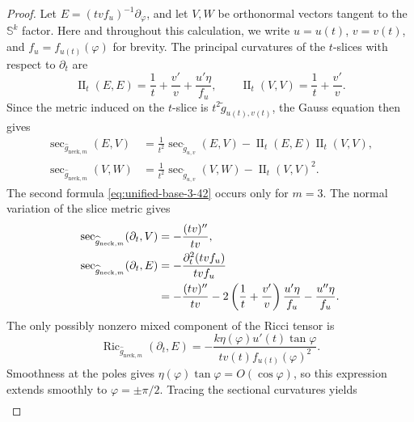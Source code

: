 \documentclass[11pt,reqno]{amsart}
\theoremstyle{definition}
\numberwithin{equation}{section}
\DeclareMathOperator{\Ric}{Ric}
\DeclareMathOperator{\II}{II}
\begin{document}
\begin{proof}
Let $E=(tvf_u)^{-1}\partial_\varphi$, and let $V,W$ be orthonormal
vectors tangent to the $\mathbb S^k$ factor.  Here and throughout this
calculation, we write $u=u(t)$, $v=v(t)$, and
$f_u=f_{u(t)}(\varphi)$ for brevity.
The principal curvatures of the $t$-slices with respect to
$\partial_t$ are
\begin{equation}
\II_t(E,E)=\frac1t+\frac{v'}v+\frac{u'\eta}{f_u},
 \qquad
 \II_t(V,V)=\frac1t+\frac{v'}v.                                 \label{eq:unified-base-3-40}
\end{equation}
Since the metric induced on the $t$-slice is
$t^2\widetilde g_{u(t),v(t)}$, the Gauss equation then gives
\begin{align}
 \sec_{\widehat g_{\mathrm{neck},m}}(E,V)
   &=\frac1{t^2}\sec_{\widetilde g_{u,v}}(E,V)
           -\II_t(E,E)\II_t(V,V),                                      \label{eq:unified-base-3-41}\\
 \sec_{\widehat g_{\mathrm{neck},m}}(V,W)
   &=\frac1{t^2}\sec_{\widetilde g_{u,v}}(V,W)
           -\II_t(V,V)^2.                                               \label{eq:unified-base-3-42}
\end{align}
The second formula \eqref{eq:unified-base-3-42} occurs only for $m=3$.  The normal variation of the
slice metric gives
\begin{align}
 \sec_{\widehat g_{\mathrm{neck},m}}(\partial_t,V)
   &=-\frac{(tv)''}{tv},                                                 \label{eq:unified-base-3-43}\\
 \sec_{\widehat g_{\mathrm{neck},m}}(\partial_t,E)
   &=-\frac{\partial_t^2(tv f_u)}{tv f_u}\notag\\
   &=-\frac{(tv)''}{tv}
      -2\left(\frac1t+\frac{v'}v\right)\frac{u'\eta}{f_u}
      -\frac{u''\eta}{f_u}.                                           \label{eq:unified-base-3-44}
\end{align}
The only possibly nonzero mixed component of the Ricci tensor is
\begin{equation}
\Ric_{\widehat g_{\mathrm{neck},m}}(\partial_t,E)
 =-\frac{k\eta(\varphi)u'(t)\tan\varphi}
         {tv(t)f_{u(t)}(\varphi)^2}.                              \label{eq:unified-base-3-45}
\end{equation}
Smoothness at the poles gives
$\eta(\varphi)\tan\varphi=O(\cos\varphi)$, so this expression
extends smoothly to $\varphi=\pm\pi/2$.  Tracing the sectional
curvatures yields
\begin{equation}
\begin{aligned}

\end{aligned}
\end{equation}
\end{proof}
\end{document}
